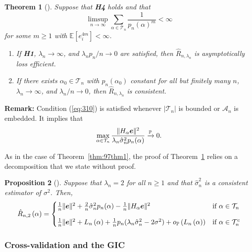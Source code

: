 \documentclass[11pt, letter paper]{article}
\newcommand{\1}{\mathmybb{1}}
\newtheorem{proposition}{Proposition}[section]
\newtheorem{theorem}[proposition]{Theorem}
\newcommand{\0}{\emptyset}
\newcommand{\prob}{\mathbb{P}}
\newcommand{\Ep}[1]{\mathbb{E}\left[ #1 \right]}
\newcommand{\paren}[1]{\left(#1 \right)}
\newcommand{\norm}[1]{|\hspace{-1pt}|#1 |\hspace{-1pt}|}
\newcommand{\normsq}[1]{\norm{#1}^{2}}
\newcommand{\Acal}{\mathcal{A}_{n}}
\newcommand{\Tcal}{\mathcal{T}_{n}}
\newcommand{\e}{\boldsymbol{e}}
\newcommand{\Loss}[1]{L_{n}\paren{#1}}
\newcommand{\Rhat}[2]{\hat{R}_{n, #1}\paren{#2}}
\newcommand{\op}[1]{o_{\prob}\paren{#1}}
\newcommand{\sigmahat}{\hat{\sigma}^{2}_{n}}
\begin{document}
\begin{theorem}[\cite{shao_1997}]\label{thm:97thm2}
    Suppose that \textbf{H4} holds and that
    \begin{equation}\label{eq:310}
        \limsup_{n\to\infty}\sum_{\alpha\in\Tcal}\frac{1}{p_{n}{(\alpha)}^{m}}<\infty
    \end{equation}
    for some \(m\geq1\) with \(\Ep{e_{i}^{4m}}<\infty\).
    \begin{enumerate}
        \item If \textbf{H1}, \(\lambda_{n}\to\infty\), and \(\lambda_{n}p_{n}/n \to 0\) are satisfied, then \(\hat{R}_{n,\lambda_{n}}\) is asymptotically loss efficient.
        \item If there exists \(\alpha_{0}\in\Tcal\) with \(p_{n}(\alpha_{0})\) constant for all but finitely many \(n\), \(\lambda_{n}\to\infty\), and \(\lambda_{n}/n\to 0\), then \(\hat{R}_{n,\lambda_{n}}\) is consistent. 
    \end{enumerate}
\end{theorem}



\textbf{Remark:} Condition (\ref{eq:310}) is satisfied whenever \(|\Tcal|\) is bounded or \(\Acal\) is embedded. It implies that 
\[ \max_{\alpha\in\Tcal} \frac{\normsq{H_{\alpha}\e}}{\lambda_{n}\sigmahat p_{n}(\alpha)}\xrightarrow{\prob} 0.\]

As in the case of Theorem~\ref{thm:97thm1}, the proof of Theorem~\ref{thm:97thm2} relies on a decomposition that we state without proof.

\begin{proposition}[\cite{shao_1997}]\label{prop:97decomp2}
    Suppose that \(\lambda_{n}=2\) for all \(n\geq 1\) and that \(\sigmahat\) is a consistent estimator of \(\sigma^{2}\). Then,
    \[\Rhat{2}{\alpha} = \begin{cases}
        \frac{1}{n}\normsq{\e} + \frac{2}{n}\sigmahat p_{n}(\alpha) - \frac{1}{n}\normsq{H_{\alpha}\e} &\text{if }\alpha\in\Tcal\\[3mm]
        \frac{1}{n}\normsq{\e} + \Loss{\alpha} + \frac{1}{n}p_{n}(\lambda_{n}\sigmahat - 2\sigma^{2}) + \op{\Loss{\alpha}} &\text{if }\alpha\in\Tcal^{c}
    \end{cases}\]
\end{proposition}

\subsubsection{Cross-validation and the GIC}
\end{document}
